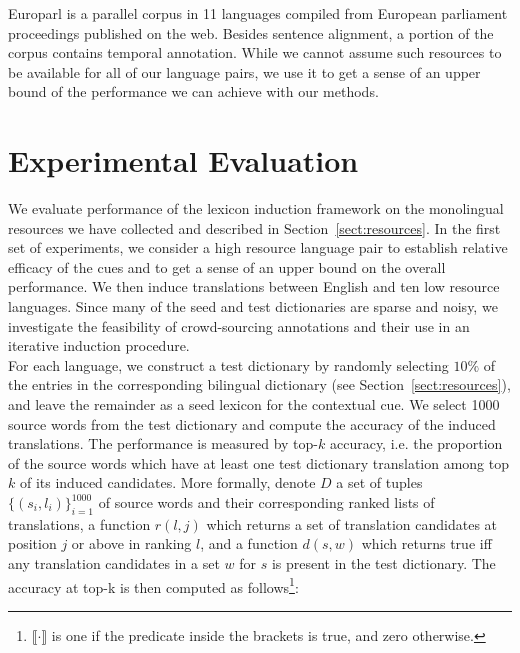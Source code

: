 \documentclass{article}
\newcommand{\mtodo}[1]{}
\newcommand{\secref}[1]{Section~\ref{#1}}
\begin{document}
\mtodo{Note: Ben's runs used an older crawl from April.}

  Europarl \cite{Koehn:2005} is a parallel corpus in 11 languages compiled from European parliament proceedings published on the web.  Besides sentence alignment, a portion of the corpus contains temporal annotation.  While we cannot assume such resources to be available for all of our language pairs, we use it to get a sense of an upper bound of the performance we can achieve with our methods.

\section{Experimental Evaluation} \label{sect:experiments}

We evaluate performance of the lexicon induction framework on the monolingual resources we have collected and described in \secref{sect:resources}.  In the first set of experiments, we consider a high resource language pair to establish relative efficacy of the cues and to get a sense of an upper bound on the overall performance. We then induce translations between English and ten low resource languages.  Since many of the seed and test dictionaries are sparse and noisy, we investigate the feasibility of crowd-sourcing annotations and their use in an iterative induction procedure. \\ %

For each language, we construct a test dictionary by randomly selecting $10\%$ of the entries in the corresponding bilingual dictionary (see \secref{sect:resources}), and leave the remainder as a seed lexicon for the contextual cue.  We select 1000 source words from the test dictionary and compute the accuracy of the induced translations.  The performance is measured by top-$k$ accuracy, i.e. the proportion of the source words which have at least one test dictionary translation among top $k$ of its induced candidates.  More formally, denote $D$ a set of tuples $\{(s_{i}, l_{i})\}_{i=1}^{1000}$ of source words and their corresponding ranked lists of translations, a function $r(l, j)$ which returns a set of translation candidates at position $j$ or above in ranking $l$, and a function $d(s, w)$ which returns true iff any translation candidates in a set $w$  for $s$ is present in the test dictionary.  The accuracy at top-k is then computed as follows\footnote{$\llbracket \cdot \rrbracket$ is one if the predicate inside the brackets is true, and zero otherwise.}:
\end{document}
